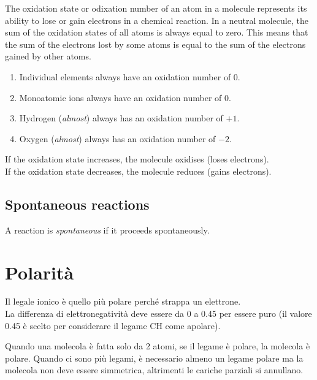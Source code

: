 \documentclass[a4paper]{article}
\begin{document}
The oxidation state or odixation number of an atom in a molecule represents its ability to lose or gain electrons in a chemical reaction. In a neutral molecule, the sum of the oxidation states of all atoms is always equal to zero. This means that the sum of the electrons lost by some atoms is equal to the sum of the electrons gained by other atoms.

\begin{enumerate}
    \item Individual elements always have an oxidation number of \(0\).
    \item Monoatomic ions always have an oxidation number of \(0\).
    \item Hydrogen (\textit{almost}) always has an oxidation number of \(+1\).
    \item Oxygen (\textit{almost}) always has an oxidation number of \(-2\).
\end{enumerate}

If the oxidation state increases, the molecule oxidises (loses electrons). \\
If the oxidation state decreases, the molecule reduces (gains electrons).

\subsection{Spontaneous reactions}

A reaction is \textit{spontaneous} if it proceeds spontaneously.



\pagebreak

\section{Polarità}

Il legale ionico è quello più polare perché strappa un elettrone. \\
La differenza di elettronegatività deve essere da 0 a 0.45 per essere puro
(il valore 0.45 è scelto per considerare il legame CH come apolare).

Quando una molecola è fatta solo da 2 atomi, 
se il legame è polare, la molecola è polare.
Quando ci sono più legami, è necessario almeno un legame polare
ma la molecola non deve essere simmetrica, altrimenti le cariche parziali si annullano.
\end{document}
